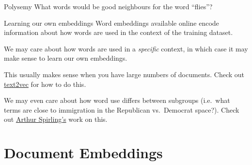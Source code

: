 \documentclass[
  10pt,
  ignorenonframetext,
  aspectratio=169]{beamer}
\begin{document}
\begin{frame}{Polysemy}
\protect\hypertarget{polysemy}{}
What words would be good neighbours for the word ``flies''?

\bigskip


\end{frame}

\begin{frame}{Learning our own embeddings}
\protect\hypertarget{learning-our-own-embeddings}{}
Word embeddings available online encode information about how words are
used in the context of the training dataset.

We may care about how words are used in a \emph{specific} context, in
which case it may make sense to learn our own embeddings.

This usually makes sense when you have large numbers of documents. Check
out \href{https://text2vec.org/glove.html}{text2vec} for how to do this.

We may even care about how word use differs between subgroups (i.e.~what
terms are close to immigration in the Republican vs.~Democrat space?).
Check out
\href{https://github.com/prodriguezsosa/EmbeddingRegression/blob/main/Explainer/explainer.md}{Arthur
Spirling's} work on this.
\end{frame}

\hypertarget{document-embeddings}{%
\section{Document Embeddings}\label{document-embeddings}}
\end{document}
